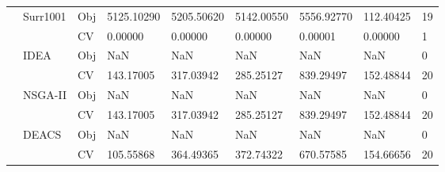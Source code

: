 \begin{table*}[!htb]
\begin{tabular}{lllllllll}
		& Surr1001                           & Obj                                & 5125.10290                         & 5205.50620                         & 5142.00550                           & 5556.92770                          & 112.40425                         & 19               \\
		&                                    & CV                                 & 0.00000                            & 0.00000                            & 0.00000                              & 0.00001                             & 0.00000                           & 1                \\
		& IDEA                               & Obj                                & NaN                                & NaN                                & NaN                                  & NaN                                 & NaN                               & 0                \\
		&                                    & CV                                 & 143.17005                          & 317.03942                          & 285.25127                            & 839.29497                           & 152.48844                         & 20               \\
		& NSGA-II                            & Obj                                & NaN                                & NaN                                & NaN                                  & NaN                                 & NaN                               & 0                \\
		&                                    & CV                                 & 143.17005                          & 317.03942                          & 285.25127                            & 839.29497                           & 152.48844                         & 20               \\
		& DEACS                              & Obj                                & NaN                                & NaN                                & NaN                                  & NaN                                 & NaN                               & 0                \\
		&                                    & CV                                 & 105.55868                          & 364.49365                          & 372.74322                            & 670.57585                           & 154.66656                         & 20               \\

\end{tabular}
\end{table*}
